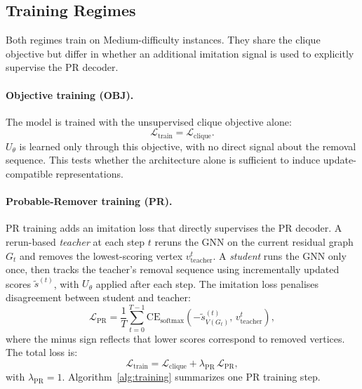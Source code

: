 \documentclass[11pt]{article}
\newcommand{\change}[1]{{\color{red}#1}}
\theoremstyle{plain}
\theoremstyle{definition}
\theoremstyle{remark}
\begin{document}
\subsection{Training Regimes}
\label{sec:training}

Both regimes train on Medium-difficulty instances. They share the clique objective
but differ in whether an additional imitation signal is used to explicitly supervise
the \change{PR} decoder.

\paragraph{Objective training (OBJ).}
The model is trained with the unsupervised clique objective alone:
\begin{equation}
  \mathcal{L}_{\mathrm{train}} = \mathcal{L}_{\mathrm{clique}}.
\end{equation}
$U_\theta$ is learned only through this objective, with no direct signal about the
removal sequence. This tests whether the architecture alone is sufficient to induce
update-compatible representations.

\paragraph{Probable-Remover training (PR).}
PR training adds an imitation loss that directly supervises the \change{PR} decoder.
A rerun-based \emph{teacher} at each step $t$ reruns the GNN on the current residual
graph $G_t$ and removes the lowest-scoring vertex $v^t_{\mathrm{teacher}}$. A
\emph{student} runs the GNN only once, then tracks the teacher's removal sequence
using incrementally updated scores $\tilde{s}^{(t)}$, with $U_\theta$ applied after
each step. The imitation loss penalises disagreement between student and teacher:
\begin{equation}
  \mathcal{L}_{\mathrm{PR}} = \frac{1}{T} \sum_{t=0}^{T-1}
  \mathrm{CE}_{\mathrm{softmax}}\!\left(-\tilde{s}^{(t)}_{V(G_t)},\,
  v^t_{\mathrm{teacher}}\right),
\end{equation}
where the minus sign reflects that lower scores correspond to removed vertices. The
total loss is:
\begin{equation}
  \mathcal{L}_{\mathrm{train}} =
  \mathcal{L}_{\mathrm{clique}} + \lambda_{\mathrm{PR}}\, \mathcal{L}_{\mathrm{PR}},
\end{equation}
with $\lambda_{\mathrm{PR}} = 1$. Algorithm~\ref{alg:training} summarizes one PR
training step.
\end{document}
